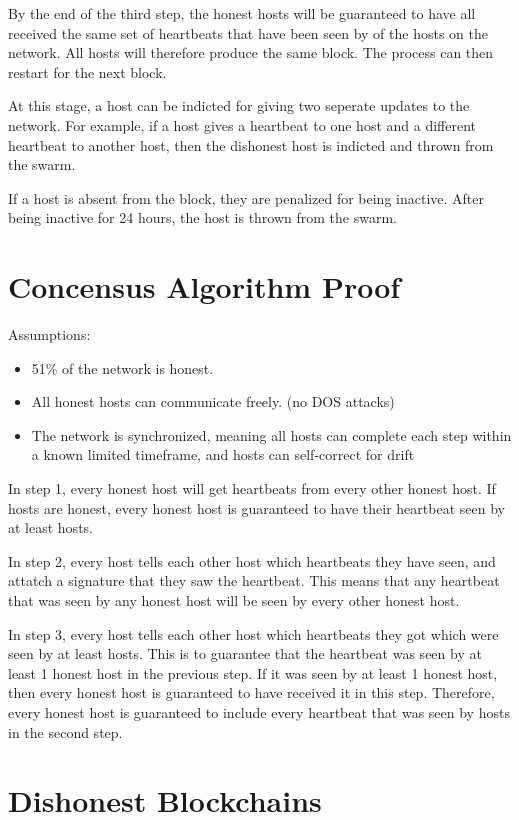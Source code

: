 \documentclass[twocolumn]{article}
\begin{document}
By the end of the third step, the honest hosts will be guaranteed to have all received the same set of heartbeats that have been seen by \fiftyone{} of the hosts on the network.
All hosts will therefore produce the same block.
The process can then restart for the next block.

At this stage, a host can be indicted for giving two seperate updates to the network.
For example, if a host gives a heartbeat to one host and a different heartbeat to another host, then the dishonest host is indicted and thrown from the swarm.

If a host is absent from the block, they are penalized for being inactive.
After being inactive for 24 hours, the host is thrown from the swarm.

\section{Concensus Algorithm Proof}

Assumptions:
\begin{itemize}
	\item 51\% of the network is honest.
	\item All honest hosts can communicate freely. (no DOS attacks)
	\item The network is synchronized, meaning all hosts can complete each step within a known limited timeframe, and hosts can self-correct for drift
\end{itemize}

In step 1, every honest host will get heartbeats from every other honest host.
If \fiftyone{} hosts are honest, every honest host is guaranteed to have their heartbeat seen by at least \fiftyone{} hosts.

In step 2, every host tells each other host which heartbeats they have seen, and attatch a signature that they saw the heartbeat.
This means that any heartbeat that was seen by any honest host will be seen by every other honest host.

In step 3, every host tells each other host which heartbeats they got which were seen by at least \fiftyone{} hosts.
This is to guarantee that the heartbeat was seen by at least 1 honest host in the previous step.
If it was seen by at least 1 honest host, then every honest host is guaranteed to have received it in this step.
Therefore, every honest host is guaranteed to include every heartbeat that was seen by \fiftyone{} hosts in the second step.

\section{Dishonest Blockchains}
\end{document}
